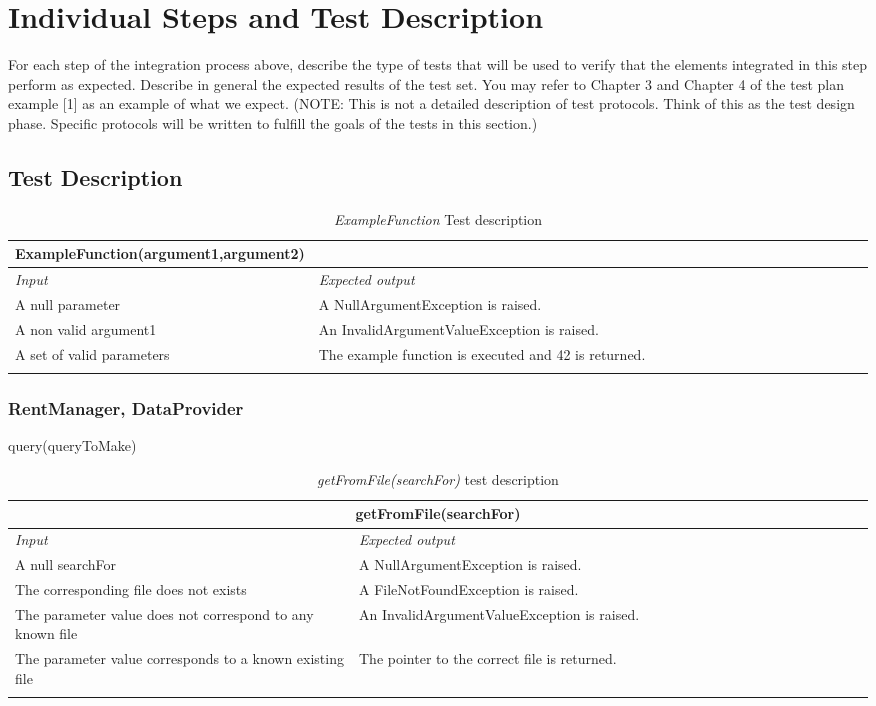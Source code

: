 \section{Individual Steps and Test Description}

For each step of the integration process above, describe the type of tests that will be used to verify that the elements integrated in this step perform as expected. Describe in general the expected results of the test set. You may refer to Chapter 3 and Chapter 4 of the test plan example [1] as an example of what we expect.
(NOTE: This is not a detailed description of test protocols. Think of this as the test design phase. Specific protocols will be written to fulfill the goals of the tests in this section.)

\subsection{Test Description}

\begin{longtable}{p{0.3\linewidth}p{0.7\linewidth}}
\hline \textbf{ExampleFunction(argument1,argument2)} \\
\toprule
\emph{Input} & \emph{Expected output} \\
\midrule
A null parameter & A NullArgumentException is raised.\\
\midrule
A non valid argument1 & An InvalidArgumentValueException is
raised. \\
\midrule
A set of valid parameters & The example function is executed and 42 is returned. \\
\bottomrule
\caption{\emph{ExampleFunction} Test description}
\end{longtable}

\subsubsection{RentManager, DataProvider}
query(queryToMake) \\

\begin{longtable}{p{0.4\linewidth}p{0.6\linewidth}}
\multicolumn{2}{c}{\textbf{getFromFile(searchFor)}} \\
\toprule
\emph{Input} & \emph{Expected output} \\
\midrule
A null searchFor & A NullArgumentException is raised.\\
\midrule
The corresponding file does not exists & A FileNotFoundException is raised. \\
\midrule
The parameter value does not correspond to any known file & An InvalidArgumentValueException is raised. \\
\midrule
The parameter value corresponds to a known existing file & The pointer to the correct file is returned. \\
\bottomrule
\caption{\emph{getFromFile(searchFor)} test description}
\end{longtable}


